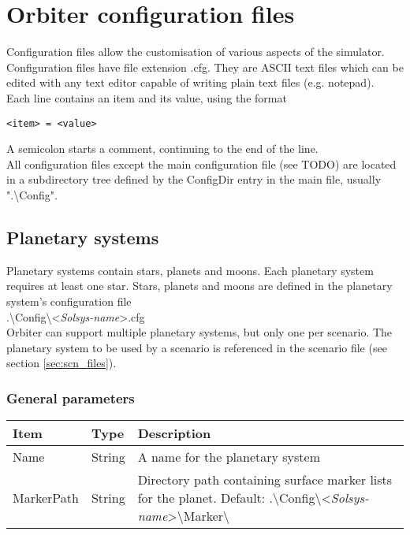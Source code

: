 \documentclass[Orbiter Developer Manual.tex]{subfiles}
\begin{document}
\section{Orbiter configuration files}
Configuration files allow the customisation of various aspects of the simulator. Configuration files have file extension .cfg. They are ASCII text files which can be edited with any text editor capable of writing plain text files (e.g. notepad).\\
Each line contains an item and its value, using the format

\begin{lstlisting}[language=OSFS]
<item> = <value>
\end{lstlisting}

\noindent
A semicolon starts a comment, continuing to the end of the line.\\
All configuration files except the main configuration file (see TODO) are located in a subdirectory tree defined by the ConfigDir entry in the main file, usually ".\textbackslash Config".

\subsection{Planetary systems}
\label{ssec:planetery_sys}
Planetary systems contain stars, planets and moons. Each planetary system requires at least one star. Stars, planets and moons are defined in the planetary system’s configuration file\\
\indent .\textbackslash Config\textbackslash <\textit{Solsys-name}>.cfg\\
Orbiter can support multiple planetary systems, but only one per scenario. The planetary system to be used by a scenario is referenced in the scenario file (see section \ref{sec:scn_files}).

\subsubsection*{General parameters}

	\begin{longtable}{ |p{}|p{}|p{}| }
	\hline\rule{0pt}{2ex}
	\textbf{Item} & \textbf{Type} & \textbf{Description}\\
	\hline\rule{0pt}{2ex}
	Name & String & A name for the planetary system\\
	\hline\rule{0pt}{2ex}
	MarkerPath & String & Directory path containing surface marker lists for the planet. Default: .\textbackslash Config\textbackslash <\textit{Solsys-name}>\textbackslash Marker\textbackslash \\
	\hline
	\end{longtable}
\end{document}
